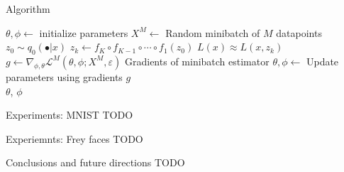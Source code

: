 \documentclass[unicode,11pt]{beamer}
\begin{document}
\begin{frame}[fragile]{Algorithm}
  \begin{algorithmic}
    \State $\theta, \phi \gets$ initialize parameters
    \Repeat
       \State $X^M \gets$ Random minibatch of $M$ datapoints
       \State $z_0 \sim q_0(\bullet|x)$
       \State $z_k \gets f_K \circ f_{K-1} \circ \cdots \circ f_1(z_0)$
       \State $L(x) \approx L(x, z_k)$
       \State $g \gets \nabla_{\phi, \theta} \mathcal{L}^M(\theta, \phi; X^M, \varepsilon) $ Gradients of minibatch estimator
       \State $\theta, \phi \gets$ Update parameters using gradients $g$
    \\
    \Return $\theta$, $\phi$
  \end{algorithmic}

\end{frame}


\begin{frame}[fragile]{Experiments: MNIST}
  TODO
\end{frame}


\begin{frame}[fragile]{Experiemnts: Frey faces}
  TODO
\end{frame}


\begin{frame}[fragile]{Conclusions and future directions}
  TODO
\end{frame}
\end{document}
